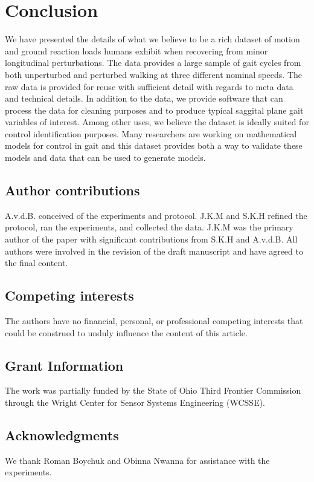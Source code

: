 \documentclass[10pt,a4paper,twocolumn]{article}
\begin{document}
\section*{Conclusion}

We have presented the details of what we believe to be a rich dataset of motion
and ground reaction loads humans exhibit when recovering from minor
longitudinal perturbations. The data provides a large sample of gait cycles
from both unperturbed and perturbed walking at three different nominal speeds.
The raw data is provided for reuse with sufficient detail with regards to meta
data and technical details. In addition to the data, we provide software that
can process the data for cleaning purposes and to produce typical saggital
plane gait variables of interest. Among other uses, we believe the dataset is
ideally suited for control identification purposes. Many researchers are
working on mathematical models for control in gait and this dataset provides
both a way to validate these models and data that can be used to generate
models.

\subsection*{Author contributions}
A.v.d.B. conceived of the experiments and protocol. J.K.M and S.K.H refined the
protocol, ran the experiments, and collected the data. J.K.M was the primary
author of the paper with significant contributions from S.K.H and A.v.d.B. All
authors were involved in the revision of the draft manuscript and have agreed
to the final content.

\subsection*{Competing interests}
The authors have no  financial, personal, or professional competing interests
that could be construed to unduly influence the content of this article.

\subsection*{Grant Information}
The work was partially funded by the State of Ohio Third Frontier Commission
through the Wright Center for Sensor Systems Engineering (WCSSE).

\subsection*{Acknowledgments}
We thank Roman Boychuk and Obinna Nwanna for assistance with the experiments.

\end{document}
